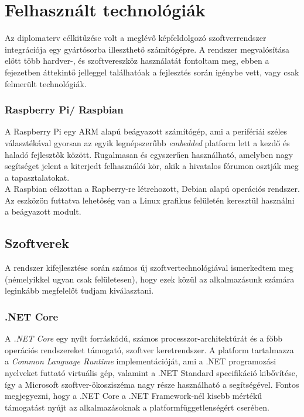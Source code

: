 \chapter{Felhasznált technológiák} \label{chapter:technologiak}

Az diplomaterv célkitűzése volt a meglévő képfeldolgozó szoftverrendszer integrációja egy gyártósorba illeszthető számítógépre. A rendszer megvalósítása előtt több hardver-, és szoftvereszköz használatát fontoltam meg, ebben a fejezetben áttekintő jelleggel találhatóak a fejlesztés során igénybe vett, vagy csak felmerült technológiák.

\subsection{Raspberry Pi/ Raspbian}

A Raspberry Pi egy ARM alapú beágyazott számítógép, ami a perifériái széles választékával gyorsan az egyik legnépszerűbb \textit{embedded} platform lett a kezdő és haladó fejlesztők között. Rugalmasan és egyszerűen használható, amelyben nagy segítséget jelent a kiterjedt felhasználói kör, akik a hivatalos fórumon osztják meg a tapasztalatokat. \\
A Raspbian célzottan a Rapberry-re létrehozott, Debian alapú operációs rendszer. Az eszközön futtatva lehetőség van a Linux grafikus felületén keresztül használni a beágyazott modult.

\section{Szoftverek}

A rendszer kifejlesztése során számos új szoftvertechnológiával ismerkedtem meg (némelyikkel ugyan csak felületesen), hogy ezek közül az alkalmazásunk számára leginkább megfelelőt tudjam kiválasztani.

\subsection{.NET Core} \label{subsec:netcore_intro}
A \emph{.NET Core} egy nyílt forráskódú, számos processzor-architektúrát és a főbb operációs rendszereket támogató, szoftver keretrendszer. A platform tartalmazza a \emph{Common Language Runtime} implementációját, ami a .NET programozási nyelveket futtató virtuális gép, valamint a .NET Standard specifikáció kibővítése, így a Microsoft szoftver-ökosziszéma nagy része használható a segítségével. Fontos megjegyezni, hogy a .NET Core a .NET Framework-nél kisebb mértékű támogatást nyújt az alkalmazásoknak a platformfüggetlenségért cserében. 

